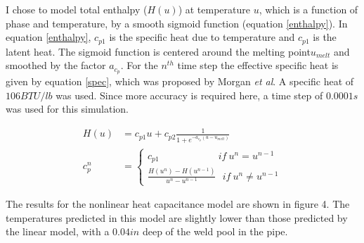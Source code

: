 \documentclass{article}
\makeatletter
\newcommand{\autocitel}[1]{\autocite{#1}\checknextarg}
\newcommand{\checknextarg}{\@ifnextchar\bgroup{\gobblenextarg}{}}
\newcommand{\gobblenextarg}[1]{$^,$\autocite{#1}\@ifnextchar\bgroup{\gobblenextarg}{}}
\makeatother
\begin{document}
	I chose to model total enthalpy ($H(u)$) at temperature $u$, which is a function of phase and temperature, by a smooth sigmoid function (equation \ref{enthalpy}). In equation \ref{enthalpy}, $c_{p1}$ is the specific heat due to temperature and $c_{p1}$ is the latent heat. The sigmoid function is centered around the melting point$u_{melt}$  and smoothed by the factor $a_{c_p}$. For the $n^{th}$ time step the effective specific heat is given by equation \ref{spec}, which was proposed by Morgan \textit{et al}\autocitel{morgan1978improved}. A specific heat of $106 BTU/lb$ was used. Since more accuracy is required here, a time step of $0.0001s$ was used for this simulation.  
	
\begin{align}
H(u) &= c_{p1} u + c_{p2} \frac{1}{1 + e^{-a_{c_p}(u - u_{melt})}} \label{enthalpy} \\
c_p^n &= \begin{cases}
c_{p1} \qquad \qquad \qquad if ~u^n = u^{n-1} \\
\frac{H(u^n) - H(u^{n-1})}{u^n - u^{n-1}}
 ~~~ if ~u^n \neq u^{n-1} \end{cases}\label{spec}
\end{align}    

The results for the nonlinear heat capacitance model are shown in figure 4. The temperatures predicted in this model are slightly lower than those predicted by the linear model, with a $0.04 in$ deep of the weld pool in the pipe.
\end{document}
